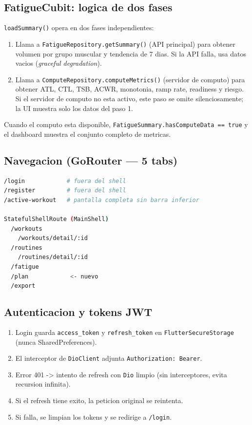 \documentclass[12pt, a4paper]{article}
\begin{document}
\subsection{FatigueCubit: logica de dos fases}

\texttt{loadSummary()} opera en dos fases independientes:

\begin{enumerate}
  \item Llama a \texttt{FatigueRepository.getSummary()} (API principal)
        para obtener volumen por grupo muscular y tendencia de 7 dias.
        Si la API falla, usa datos vacios (\emph{graceful degradation}).
  \item Llama a \texttt{ComputeRepository.computeMetrics()} (servidor de computo)
        para obtener ATL, CTL, TSB, ACWR, monotonia, ramp rate, readiness y riesgo.
        Si el servidor de computo no esta activo, este paso se omite
        silenciosamente; la UI muestra solo los datos del paso 1.
\end{enumerate}

Cuando el computo esta disponible, \texttt{FatigueSummary.hasComputeData == true}
y el dashboard muestra el conjunto completo de metricas.

\subsection{Navegacion (GoRouter --- 5 tabs)}

\begin{lstlisting}[language=bash]
/login            # fuera del shell
/register         # fuera del shell
/active-workout   # pantalla completa sin barra inferior

StatefulShellRoute (MainShell)
  /workouts
    /workouts/detail/:id
  /routines
    /routines/detail/:id
  /fatigue
  /plan            <- nuevo
  /export
\end{lstlisting}

\subsection{Autenticacion y tokens JWT}

\begin{enumerate}
  \item Login guarda \texttt{access\_token} y \texttt{refresh\_token}
        en \texttt{FlutterSecureStorage} (nunca SharedPreferences).
  \item El interceptor de \texttt{DioClient} adjunta \texttt{Authorization: Bearer}.
  \item Error 401 -> intento de refresh con \texttt{Dio} limpio (sin interceptores,
        evita recursion infinita).
  \item Si el refresh tiene exito, la peticion original se reintenta.
  \item Si falla, se limpian los tokens y se redirige a \texttt{/login}.
\end{enumerate}
\end{document}
